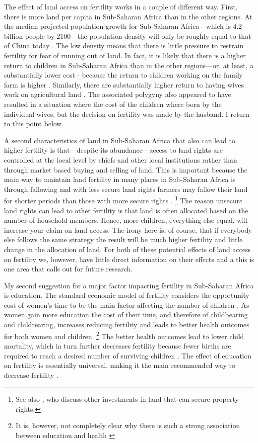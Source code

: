 \documentclass[letterpaper,12pt]{article}
\begin{document}
The effect of land access on fertility works in a couple of 
different way.
First, there is more land per capita in Sub-Saharan Africa than
in the other regions.
At the median projected population growth for Sub-Saharan 
Africa---which is 4.2 billion people by 2100---the 
population density will only be roughly equal to
that of China today \citep[p 235]{Gerland2014}.
The low density means that there is little pressure to 
restrain fertility for fear of running out of land.
In fact, it is likely that there is a higher return to
children in Sub-Saharan Africa than in the other regions---or,
at least, a substantially lower cost---because the return to
children working on the family farm is higher \citep{Caldwell1992}.
Similarly, there are substantially higher return to having 
wives work on agricultural land \citep{jacoby95}.
The associated polygyny also appeared to have resulted
in a situation where the cost of the children where born
by the individual wives, but the decision on fertility
was made by the husband.
I return to this point below.

A second characteristics of land in Sub-Saharan Africa that
also can lead to higher fertility is that---despite its
abundance---access to land rights are controlled at the local
level by chiefs and other local institutions rather than through
market based buying and selling of land.
This is important because the main way to maintain land fertility
in many places in Sub-Saharan Africa is through fallowing and
with less secure land rights farmers may fallow their land
for shorter periods than those with more secure rights 
\citep{Goldstein2008}.%
\footnote{
See also \citet{besley95c}, who discuss other investments in
land that can secure property rights.
}
The reason unsecure land rights can lead to other fertility
is that land is often allocated based on the number of household
members.
Hence, more children, everything else equal, will increase your
claim on land access.
The irony here is, of course, that if everybody else follows
the same strategy the result will be much higher fertility
and little change in the allocation of land.
For both of these potential effects of land access on
fertility we, however, have little direct information on
their effects and a this is one area that calls out for
future research.

My second suggestion for a major factor impacting fertility
in Sub-Saharan Africa is education.
The standard economic model of fertility considers the 
opportunity cost of women's time to be the main factor 
affecting the number of children \citep{becker91}.
As women gain more education the cost of their time,
and therefore of childbearing and childrearing, increases
reducing fertility and leads to better health outcomes
for both women and children.%
\footnote{
It is, however, not completely clear why there is
such a strong association between education and health
\citep{Thomas1991,Glewwe1999,Kovsted2002}
}
The better health outcomes lead to lower child mortality,
which in turn further decreases fertility because fewer
births are required to reach a desired number of surviving
children \citep{Ainsworth1996}.
The effect of education on fertility is essentially universal,
making it the main recommended way to decrease 
fertility \citep{schultz02}.
\end{document}
